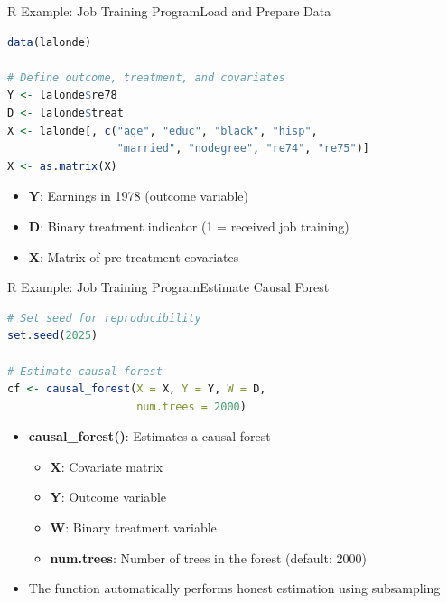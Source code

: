 \documentclass[hyperref={pdfpagelabels=false}]{beamer}
\begin{document}
\begin{frame}[fragile]{R Example: Job Training Program}{Load and Prepare Data}
\begin{lstlisting}[language=R]
data(lalonde)

# Define outcome, treatment, and covariates
Y <- lalonde$re78
D <- lalonde$treat
X <- lalonde[, c("age", "educ", "black", "hisp",
                 "married", "nodegree", "re74", "re75")]
X <- as.matrix(X)
\end{lstlisting}
	\begin{itemize}
		\item \textbf{Y}: Earnings in 1978 (outcome variable)
		\vspace{0.2cm}
		\item \textbf{D}: Binary treatment indicator (1 = received job training)
		\vspace{0.2cm}
		\item \textbf{X}: Matrix of pre-treatment covariates
	\end{itemize}
\end{frame}




\begin{frame}[fragile]{R Example: Job Training Program}{Estimate Causal Forest}
\begin{lstlisting}[language=R]
# Set seed for reproducibility
set.seed(2025)

# Estimate causal forest
cf <- causal_forest(X = X, Y = Y, W = D,
                    num.trees = 2000)
\end{lstlisting}
	\begin{itemize}
		\item \textbf{causal\_forest()}: Estimates a causal forest
		\vspace{0.2cm}
		\begin{itemize}
			\item \textbf{X}: Covariate matrix
			\vspace{0.2cm}
			\item \textbf{Y}: Outcome variable
			\vspace{0.2cm}
			\item \textbf{W}: Binary treatment variable
			\vspace{0.2cm}
			\item \textbf{num.trees}: Number of trees in the forest (default: 2000)
		\end{itemize}
		\vspace{0.2cm}
		\item The function automatically performs honest estimation using subsampling
	\end{itemize}
\end{frame}
\end{document}
